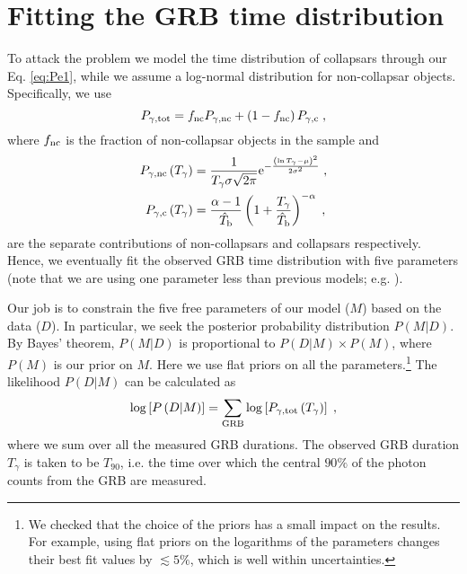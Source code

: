\documentclass[useAMS,usenatbib]{mn2e}
\def\e{{\rm e}}
\begin{document}
\appendix
\section{Fitting the GRB time distribution}
\label{sec:appendix}

To attack the problem we model the time distribution of collapsars through our Eq. \eqref{eq:Pe1}, while we assume a log-normal distribution for non-collapsar objects. Specifically, we use
\begin{equation}
\label{eq:t_distr}
P_{\rm \gamma,tot}=f_{\rm nc}P_{\rm \gamma,nc}+\left(1-f_{\rm nc}\right)P_{\rm \gamma,c} \;,
\end{equation}
where $f_{\rm nc}$ is the fraction of non-collapsar objects in the sample and
\begin{align}
\label{eq:Pnc}
P_{\rm \gamma,nc}\left(T_\gamma\right)&=\frac{1}{T_\gamma\sigma\sqrt{2\pi}}\e^{-\frac{\left(\ln T_\gamma-\mu\right)^2}{2\sigma^2}}\;,\\
\label{eq:Pc}
P_{\rm \gamma,c}\left(T_\gamma\right) & =\frac{\alpha-1}{\hat{T}_{\rm b}}
\left(1+\frac{T_\gamma}{\hat{T}_{\rm b}}\right)^{-\alpha}\;,
\end{align}
are the separate contributions of non-collapsars and collapsars respectively. Hence, we eventually fit the observed GRB time distribution with five parameters (note that we are using one parameter less than previous models; e.g. \citealt{Bromberg2013}).

Our job is to constrain the five free parameters of our model ($M$) based on the data ($D$). In particular, we seek the posterior probability distribution $P\left(M|D\right)$. By Bayes' theorem, $P\left(M|D\right)$ is proportional to $P\left(D|M\right)\times P\left(M\right)$, where $P\left(M\right)$ is our prior on $M$. Here we use flat priors on all the parameters.\footnote{We checked that the choice of the priors has a small impact on the results. For example, using flat priors on the logarithms of the parameters changes their best fit values by $\lesssim 5\%$, which is well within uncertainties.}
The likelihood $P\left(D|M\right)$ can be calculated as
\begin{equation}
\log\left[P\left(D|M\right)\right]=\sum_{\text{GRB}}\log\left[P_{\rm \gamma,tot}\left(T_\gamma\right)\right]\;,
\end{equation}
where we sum over all the measured GRB durations. The  observed  GRB  duration $T_\gamma$ is taken to be $T_{90}$,  i.e. the time over which the central $90\%$ of the photon counts from the GRB are measured.
\end{document}
